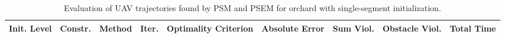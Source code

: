 \begin{table}
\small

\caption{Evaluation of UAV trajectories found by PSM and PSEM for orchard with single-segment initialization.}
\label{tab:traj-plan-eval-orchard-single}
\begin{tabular}{p{21mm}p{9mm}p{12mm}p{6mm}p{14mm}p{14mm}p{14mm}p{14mm}p{14mm}}
\toprule
Init. Level & Constr. & Method & Iter. & Optimality Criterion & Absolute Error & Sum Viol. & Obstacle Viol. & Total Time \\
\midrule
\bottomrule
\end{tabular}
\end{table}

